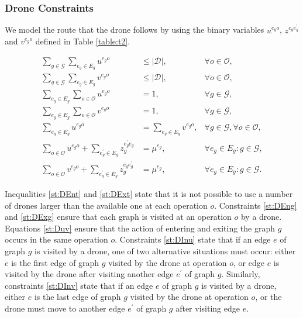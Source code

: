 \documentclass[10pt,a4paper]{elsarticle}
\newcommand{\EN}[1]{{\color{black}#1}}
\begin{document}
\subsubsection*{Drone Constraints}
\noindent
We model the route that the drone follows by using the binary variables $u^{e_go}$, $z^{e_ge^\prime_g}$ and $v^{e_go}$ defined in Table \ref{table:t2}.



\begin{align}
\sum_{g\in \mathcal G}\sum_{e_g\in E_g}  u^{e_go} & \leq |\mathcal D|, &\forall o\in \mathcal O,\label{st:DEnt}\\
\sum_{g\in \mathcal G}\sum_{e_g\in E_g}  v^{e_go} & \leq |\mathcal D|, &\forall o\in \mathcal O,\label{st:DExt} \\
\sum_{e_g\in E_g} \sum_{o\in \mathcal O} u^{e_go} & = 1, &\forall g\in\mathcal G, \label{st:DEng}\\
\sum_{e_g\in E_g} \sum_{o\in \mathcal O} v^{e_go} & = 1, &\forall g\in\mathcal G, \label{st:DExg}\\
\sum_{e_g\in E_g} u^{e_go} & = \sum_{e_g\in E_g} v^{e_go}, &\forall g\in\mathcal G, \forall o\in \mathcal O, \label{st:Duv}\\
\sum_{o\in \mathcal O} u^{e_go} + \sum_{e^\prime_g\in E_g} z_g^{e^\prime_ge_g} & = \mu^{e_g}, &\forall e_g\in E_g:g\in\mathcal G, \label{st:DInu}\\
\sum_{o\in \mathcal O} v^{e_go} + \sum_{e^\prime_g\in E_g} z_g^{e_ge^\prime_g} & = \mu^{e_g}, &\forall e_g\in E_g:g\in\mathcal G. \label{st:DInv}
\end{align}

\noindent 
Inequalities \eqref{st:DEnt} and \eqref{st:DExt} state that it is not possible to use a number of drones \EN{larger} than the available one at each operation $o$.  Constraints \eqref{st:DEng} and \eqref{st:DExg} \EN{ensure} that each graph is visited at \EN{an} operation $o$ by \EN{a} drone. Equations \eqref{st:Duv} ensure that the action of entering and exiting the graph $g$ occurs in the same operation $o$. Constraints \eqref{st:DInu} state that if an edge $e$ of graph $g$ is visited by a drone, one of two alternative situations must occur: either $e$ is the first edge of graph $g$ visited by the drone at operation $o$, or edge $e$ is visited by the drone after visiting another edge $e^\prime$ of graph $g$. Similarly, constraints \eqref{st:DInv} state that if an edge $e$ of graph $g$ is visited by a drone, either $e$ is the last edge of graph $g$ visited by the drone at operation $o$, or the drone must move to another edge $e^\prime$ of graph $g$ after visiting edge $e$.
\end{document}
